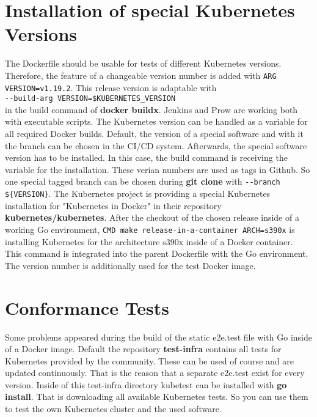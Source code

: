 \section{Installation of special Kubernetes Versions}

The Dockerfile should be usable for tests of different Kubernetes versions. Therefore, the feature of a changeable version number is added with \lstinline!ARG VERSION=v1.19.2!. This release version is adaptable with \\
\verb+--build-arg VERSION=$KUBERNETES_VERSION+ \\
in the build command of \textbf{docker buildx}.
Jenkins and Prow are working both with executable scripts. The Kubernetes version can be handled as a variable for all required Docker builds.
Default, the version of a special software and with it the branch can be chosen in the \gls{CI/CD} system. Afterwards, the special software version has to be installed. In this case, the build command is receiving the variable for the installation. These verian numbers are used as tags in Github. So one special tagged branch can be chosen during \textbf{git clone} with \verb+--branch ${VERSION}+.
The Kubernetes project is providing a special Kubernetes installation for "Kubernetes in Docker" in their repository \textbf{kubernetes/kubernetes}.
After the checkout of the chosen release inside of a working Go environment, \verb+CMD make release-in-a-container ARCH=s390x+ is installing Kubernetes for the architecture s390x inside of a Docker container. \\
This command is integrated into the parent Dockerfile with the Go environment. The version number is additionally used for the test Docker image.


\section{Conformance Tests}

Some problems appeared during the build of the static e2e.test file with Go inside of a Docker image. 
Default the repository \textbf{test-infra} contains all tests for Kubernetes provided by the community. 
These can be used of course and are updated continuously. That is the reason that a separate e2e.test exist for every version. Inside of this test-infra directory kubetest can be installed with \textbf{go install}. 
That is downloading all available Kubernetes tests. So you can use them to test the own Kubernetes cluster and the used software. \\

